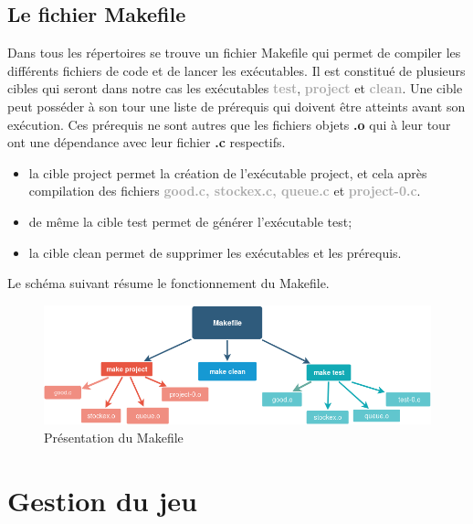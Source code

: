 \documentclass[a4paper,12pt]{article}
\begin{document}
  \subsection{Le fichier Makefile}
Dans tous les répertoires se trouve un fichier Makefile qui permet de compiler les différents fichiers de code et de lancer les exécutables. Il est constitué de plusieurs cibles qui seront dans notre cas les exécutables \textcolor{darkgray}{\textbf{test}}, \textcolor{darkgray}{\textbf{project}} et \textcolor{darkgray}{\textbf{clean}}. Une cible peut posséder à son tour une liste de prérequis qui doivent être atteints avant son exécution. Ces prérequis ne sont autres que les fichiers objets \textbf{.o} qui à leur tour ont une dépendance avec leur fichier \textbf{.c} respectifs.
\begin{itemize}
\item la cible project permet la création de l'exécutable project, et cela après compilation des fichiers \textcolor{darkgray}{\textbf{good.c, stockex.c, queue.c}} et \textcolor{darkgray}{\textbf{project-0.c}}.
\item de même la cible test permet de générer l'exécutable test;
\item  la cible clean permet de supprimer les exécutables et les prérequis.
\end{itemize}
Le schéma suivant résume le fonctionnement du Makefile. 
\begin{figure}[!h]
  \centering
  \includegraphics[width=1\textwidth]{makefile.png}
  \caption{Présentation du Makefile}
  \label{fig:make}
\end{figure}

\section{Gestion du jeu}
\end{document}

